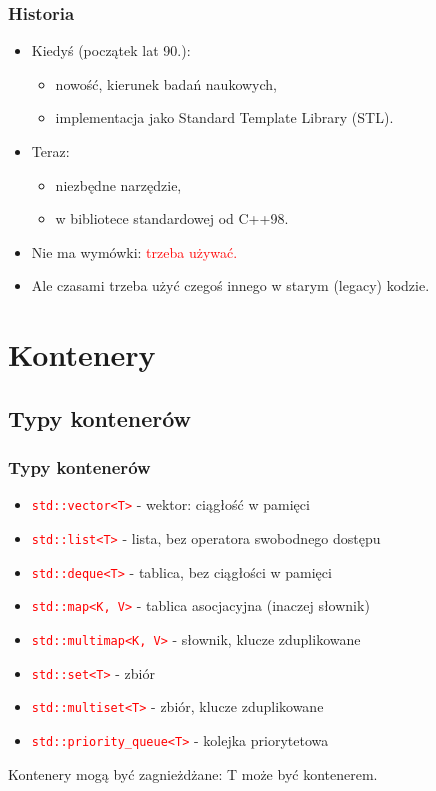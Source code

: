 \documentclass[compress]{beamer}
\newcommand{\red}[1]{\textcolor{red}{#1}}
\newcommand{\code}[1]{\texttt{\red{#1}}}
\begin{document}
\begin{frame}

  \frametitle{Historia}

  \begin{itemize}
  \item Kiedyś (początek lat 90.):
    \begin{itemize}
    \item nowość, kierunek badań naukowych,
    \item implementacja jako Standard Template Library (STL).
    \end{itemize}
  \item Teraz:
    \begin{itemize}
    \item niezbędne narzędzie,
    \item w bibliotece standardowej od C++98.
    \end{itemize}
  \item Nie ma wymówki: \red{trzeba używać.}
  \item Ale czasami trzeba użyć czegoś innego w starym (legacy)
    kodzie.
  \end{itemize}

\end{frame}


\section{Kontenery}

\subsection{Typy kontenerów}

\begin{frame}

  \frametitle{Typy kontenerów}

  \begin{itemize}
  \item \code{std::vector{<}T{>}} - wektor: ciągłość w pamięci
  \item \code{std::list{<}T{>}} - lista, bez operatora swobodnego dostępu
  \item \code{std::deque{<}T{>}} - tablica, bez ciągłości w pamięci
  \item \code{std::map{<}K, V{>}} - tablica asocjacyjna (inaczej słownik)
  \item \code{std::multimap{<}K, V{>}} - słownik, klucze zduplikowane
  \item \code{std::set{<}T{>}} - zbiór
  \item \code{std::multiset{<}T{>}} - zbiór, klucze zduplikowane
  \item \code{std::priority\_queue{<}T{>}} - kolejka priorytetowa
  \end{itemize}

  Kontenery mogą być zagnieżdżane: T może być kontenerem.

\end{frame}
\end{document}
